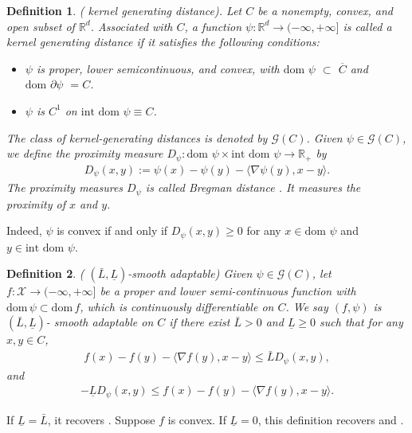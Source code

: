 \documentclass[letterpaper]{article} %
\newtheorem{definition}{Definition}
\begin{document}
	\begin{definition}\label{def:kernel}
		(\cite{AuslenderT06,BolteSTV18First} kernel generating distance). Let $C$ be a nonempty, convex, and open subset of $\mathbb{R}^{d}$. Associated with $C$, a function $\psi:\mathbb{R}^{d} \rightarrow (-\infty, +\infty]$ is called a kernel generating distance if it satisfies the following conditions:
		\begin{itemize}
			\item $\psi$ is proper, lower semicontinuous, and convex, with $\text{dom } \psi$ $\subset$ $\overline{C}$ and  $\text{dom } \partial \psi$  $=C$.
			\item  $\psi$ is $C^{1}$ on $\text{int dom } \psi \equiv C$.
		\end{itemize}
		The class of kernel-generating distances is denoted by $\mathcal{G}(C)$. Given $\psi\in\mathcal{G}(C)$, we  define the proximity measure $D_{\psi} : \text{dom } \psi \times \text{int dom }\psi \rightarrow \mathbb{R}_{+}$ by
		\begin{eqnarray}
			D_{\psi}(x, y) := \psi (x) - \psi (y) - \langle \nabla\psi(y), x - y\rangle.
		\end{eqnarray}
		The proximity measures $D_{\psi}$ is called Bregman distance \cite{Bregman67The}. It measures the proximity of $x$ and $y$. 
	\end{definition}
	Indeed, $\psi$ is convex if and only if $D_{\psi}(x,y) \ge 0$ for any $x\in\text{dom }\psi$ and $y\in\text{int dom }\psi$.
	
	\begin{definition}\label{Ll-smooth}
		(\cite{MukkamalaOPS20} $(\bar{L},\underline{L})$-smooth adaptable) Given $\psi\in\mathcal{G}(C)$, let $f:\mathcal{X}\rightarrow(-\infty,+\infty]$ be a proper and lower semi-continuous function with $\mathrm{dom}\,\psi\subset\mathrm{dom}\,f$, which is continuously differentiable on $C$. We say $(f, \psi)$ is $(\bar{L},\underline{L})$- smooth adaptable  on $C$ if there exist $\bar{L}>0$ and $\underline{L}\ge0$ such that for any $x,y\in C$,
		\begin{eqnarray}
			f(x)-f(y)-\langle\nabla f(y),x-y\rangle\le \bar{L} D_{\psi}(x,y),\label{L_upper}
		\end{eqnarray}
		and
		\begin{eqnarray}
			-\underline{L}D_{\psi}(x,y)\le f(x)-f(y)-\langle \nabla f(y),x-y\rangle.\label{L_lower}
		\end{eqnarray}
	\end{definition}
	If $\underline{L}=\bar{L}$, it recovers \cite[Definition 2.2]{BolteSTV18First}. Suppose  $f$ is convex. If $\underline{L}=0$, this definition recovers \cite[Lemma 1]{BauschkeBT17} and \cite[Definition 1.1]{LuFN18}. 
	
\end{document}
